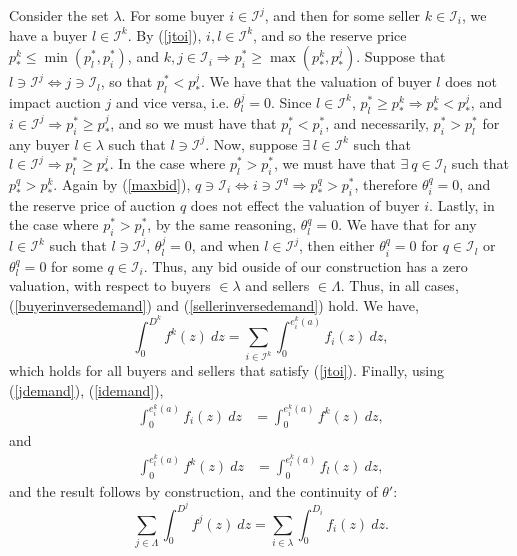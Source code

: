 \documentclass[12pt]{article}
\theoremstyle{definition}
\newcommand{\mcI}{\mathcal{I}}
\begin{document}
\begin{multicols}{2}
Consider the set $\lambda$. For some buyer $i\in\mcI^j$, and then for
some seller $k \in \mcI_i$, we have a buyer $l \in \mcI^k$. By (\ref{jtoi}), $i,l \in \mcI^k$, and so the reserve price $p_*^k \le \min(p_l^*,
p_i^*)$, and $k, j\in \mcI_i\Rightarrow p_i^* \ge \max(p_*^k, p_*^j)$.
Suppose that $l \ni \mcI^j\Leftrightarrow j \ni \mcI_l$, so
that $p_l^* < p_*^j$. We have that
the valuation of buyer $l$ does not impact auction $j$ and vice versa, i.e. $\theta_l^j = 0$. Since $l\in\mcI^k$, $p_l^* \ge p_*^k\Rightarrow
p_*^k < p_*^j$, and $i\in\mcI^j \Rightarrow p_i^* \ge p_*^j$, and so we must
have that $p_l^* < p_i^*$,
and necessarily, $p_i^* > p_l^*$ for
any buyer $l\in\lambda$ such that $l\ni \mcI^j$. Now, suppose $\exists \ l\in\mcI^k$ such that $l\in\mcI^j \Rightarrow p_l^* \ge
p_*^j$. In the case where $p_l^* > p_i^*$, we must have that 
$\exists \ q \in \mcI_l$ such that $p_*^q > p_*^k$. %
Again by (\ref{maxbid}), $q\ni\mcI_i \Leftrightarrow i
\ni\mcI^q \Rightarrow p_*^q >
p_i^*$, therefore $\theta_i^q = 0$, and the reserve price of auction $q$ does not effect the valuation of
buyer $i$. 
Lastly, 
in the case where $p_i^* > p_l^*$, by the same reasoning, $\theta_l^q = 0$.
We have that for any $l\in\mcI^k$ such that $l\ni
\mcI^j$, $\theta_l^j =0$, and when $l\in \mcI^j$, then either $\theta_i^q =0$
for $q\in\mcI_l$ or $\theta_l^q = 0$ for some $q\in\mcI_i$. Thus, any bid ouside of
our construction
has a zero valuation, with respect to buyers $\in\lambda$ and sellers
$\in\Lambda$. Thus, in all cases,
(\ref{buyerinversedemand}) and (\ref{sellerinversedemand}) hold.
We have,
\begin{equation}\label{idemand}
    \displaystyle\int_0^{D^k} f^k(z) \ dz = \sum_{i\in\mcI^k}\int_0^{e_i^k(a)}
f_i(z) \ dz,
\end{equation}
which holds for all buyers and sellers that satisfy (\ref{jtoi}).
Finally, using (\ref{jdemand}), (\ref{idemand}), 
\begin{align*}
    \int_0^{e_i^k(a)} f_i(z) \ dz &= \int_0^{e_i^k(a)} f^k(z) \ dz,
\end{align*}
and
\begin{align*}
    \int_0^{e_l^k(a)} f^k(z) \ dz &= \int_0^{e_l^k(a)} f_l(z) \ dz,
\end{align*}
and the result follows by construction, and the continuity of $\theta'$:
\begin{equation}
    \displaystyle\sum_{j\in\Lambda} \int_0^{D^j} f^j(z) \ dz =
\sum_{i\in\lambda}\int_0^{D_i} f_i(z) \ dz.
\end{equation}


\end{multicols}
\end{document}

